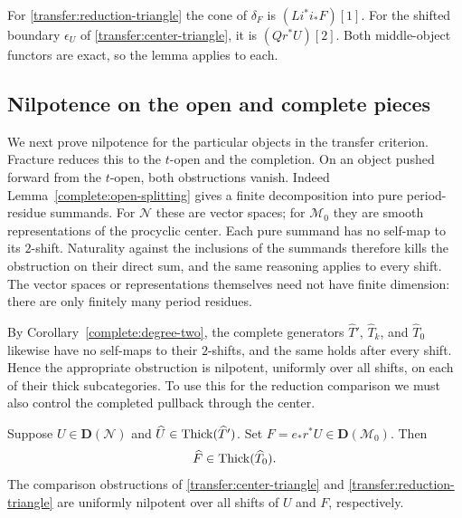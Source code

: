 For \eqref{transfer:reduction-triangle} the cone of $\delta_F$ is
$(Li^*i_*F)[1]$. For the shifted boundary $\epsilon_U$ of
\eqref{transfer:center-triangle}, it is $(Qr^*U)[2]$.
Both middle-object functors are exact, so the lemma applies to each.

\subsection{Nilpotence on the open and complete pieces}

We next prove nilpotence for the particular objects in the transfer
criterion. Fracture reduces this to the $t$-open and the completion.
On an object pushed forward from the $t$-open, both obstructions
vanish. Indeed Lemma~\ref{complete:open-splitting} gives a finite
decomposition into pure period-residue summands. For $\mathcal N$
these are vector spaces; for $\mathcal M_0$ they are smooth
representations of the procyclic center. Each pure summand has no
self-map to its $2$-shift. Naturality against the inclusions of the
summands therefore kills the obstruction on their direct sum, and
the same reasoning applies to every shift. The vector spaces or
representations themselves need not have finite dimension: there are
only finitely many period residues.

By Corollary~\ref{complete:degree-two}, the complete generators
$\widehat T'$, $\widehat T_k$, and $\widehat T_0$ likewise
have no self-maps to their $2$-shifts, and the same holds after every
shift. Hence the appropriate obstruction
is nilpotent, uniformly over all shifts, on each of their thick
subcategories. To use this for the reduction comparison we must also
control the completed pullback through the center.

\begin{lemma}
\label{transfer:central-completion}
Suppose $U\in\mathbf D(\mathcal N)$ and
$\widehat U\in\operatorname{Thick}(\widehat T')$. Set
$F=e_*r^*U\in\mathbf D(\mathcal M_0)$. Then
\[
 \widehat F\in\operatorname{Thick}(\widehat T_0).
\]
The comparison obstructions of
\eqref{transfer:center-triangle} and
\eqref{transfer:reduction-triangle} are uniformly nilpotent over all shifts of
$U$ and $F$, respectively.
\end{lemma}

